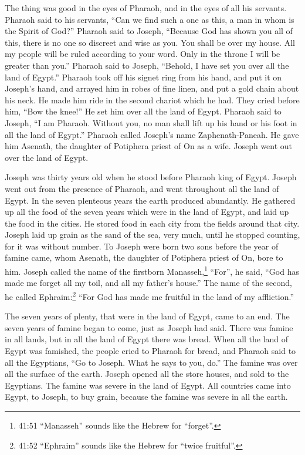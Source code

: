 \myverse{}The thing was good in the eyes of Pharaoh, and in the eyes of all his servants.   \myverse{}Pharaoh said to his servants, “Can we find such a one as this, a man in whom is the Spirit of God?”   \myverse{}Pharaoh said to Joseph, “Because God has shown you all of this, there is no one so discreet and wise as you.   \myverse{}You shall be over my house. All my people will be ruled according to your word. Only in the throne I will be greater than you.”   \myverse{}Pharaoh said to Joseph, “Behold, I have set you over all the land of Egypt.”   \myverse{}Pharaoh took off his signet ring from his hand, and put it on Joseph’s hand, and arrayed him in robes of fine linen, and put a gold chain about his neck.   \myverse{}He made him ride in the second chariot which he had. They cried before him, “Bow the knee!” He set him over all the land of Egypt.   \myverse{}Pharaoh said to Joseph, “I am Pharaoh. Without you, no man shall lift up his hand or his foot in all the land of Egypt.”   \myverse{}Pharaoh called Joseph’s name Zaphenath-Paneah. He gave him Asenath, the daughter of Potiphera priest of On as a wife. Joseph went out over the land of Egypt.

\myverse{}Joseph was thirty years old when he stood before Pharaoh king of Egypt. Joseph went out from the presence of Pharaoh, and went throughout all the land of Egypt.   \myverse{}In the seven plenteous years the earth produced abundantly.   \myverse{}He gathered up all the food of the seven years which were in the land of Egypt, and laid up the food in the cities. He stored food in each city from the fields around that city.   \myverse{}Joseph laid up grain as the sand of the sea, very much, until he stopped counting, for it was without number.   \myverse{}To Joseph were born two sons before the year of famine came, whom Asenath, the daughter of Potiphera priest of On, bore to him.    \myverse{}Joseph called the name of the firstborn Manasseh,\footnote{41:51 “Manasseh” sounds like the Hebrew for “forget”.} “For”, he said, “God has made me forget all my toil, and all my father’s house.”   \myverse{}The name of the second, he called Ephraim:\footnote{41:52 “Ephraim” sounds like the Hebrew for “twice fruitful”.} “For God has made me fruitful in the land of my affliction.”

\myverse{}The seven years of plenty, that were in the land of Egypt, came to an end.   \myverse{}The seven years of famine began to come, just as Joseph had said. There was famine in all lands, but in all the land of Egypt there was bread.   \myverse{}When all the land of Egypt was famished, the people cried to Pharaoh for bread, and Pharaoh said to all the Egyptians, “Go to Joseph. What he says to you, do.”   \myverse{}The famine was over all the surface of the earth. Joseph opened all the store houses, and sold to the Egyptians. The famine was severe in the land of Egypt.   \myverse{}All countries came into Egypt, to Joseph, to buy grain, because the famine was severe in all the earth.

